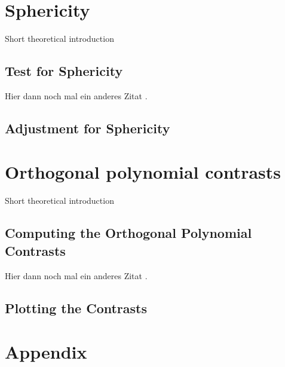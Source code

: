 \documentclass[11pt]{article}
\begin{document}
	\section{Sphericity}
	Short theoretical introduction
		\subsection{Test for Sphericity}
		Hier dann noch mal ein anderes Zitat \citep{003}.
		\subsection{Adjustment for Sphericity}
	
	\section{Orthogonal polynomial contrasts}
	Short theoretical introduction
		\subsection{Computing the Orthogonal Polynomial Contrasts}
		Hier dann noch mal ein anderes Zitat \citep{003}.
		\subsection{Plotting the Contrasts}
	

 
	\section*{Appendix}
	\newpage
 
 
 
	
\end{document}
